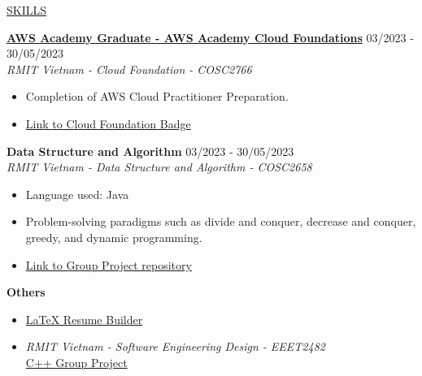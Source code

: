 \documentclass[11pt]{article}
\newcommand{\betteruline}[1]{
    \uline{#1}
}
\newcommand{\sectiontitle}[1]{
    \begingroup
        \titlebold
        \betteruline{\Large\uppercase{#1}  }
        \vspace{1.7mm}
    \endgroup
}
\newcommand{\sectioncontent}[1]{
    \begingroup
        \begin{FlushLeft}
        \vspace{-3mm}
        \sffamily\small#1
        \end{FlushLeft}
    \endgroup
    \vspace{2mm}
}
\newcommand{\project}[2]{
    \begingroup
        \textbf{\small#1}
        \hfill\color{black!70}\small{#2}
    \endgroup
}
\newcommand{\spacevv}{
    \vspace{2mm}
}
\begin{document}
\begin{paracol}{2}
    \sectiontitle{Skills}
    \sectioncontent{
    \vspace{1mm}
        \project{\href{https://www.credly.com/badges/20c053cd-785a-4100-bc79-bd1c902d5c28/public_url}{AWS Academy Graduate - AWS Academy Cloud Foundations}}{03/2023 - 30/05/2023} \\
    \vspace{1mm}
        \textcolor{black!70}{\textit{RMIT Vietnam - Cloud Foundation - COSC2766}}
        \vspace{1mm}
        \begin{itemize}
            \item  Completion of AWS Cloud Practitioner Preparation.
\vspace{1mm} 
            \item \textcolor{blue}{\href{https://www.credly.com/badges/20c053cd-785a-4100-bc79-bd1c902d5c28/public_url}{Link to Cloud Foundation Badge}}
        \end{itemize}
        \spacevv

       \project{Data Structure and Algorithm}{03/2023 - 30/05/2023} \\
    \vspace{1mm}
        \textcolor{black!70}{\textit{RMIT Vietnam - Data Structure and Algorithm - COSC2658}}
        \vspace{1mm}
        \begin{itemize}
        \item Language used: Java
\vspace{1mm} 
\item Problem-solving paradigms such as divide and conquer, decrease and conquer, greedy, and dynamic programming.
\vspace{1mm} 
            \item \textcolor{blue}{\href{https://github.com/miketvo/rmit2023a-cosc2658-group-project}{Link to Group Project repository}}
        \end{itemize}
        \spacevv
       
        \project{Others}{} \\
        \begin{itemize}
        \vspace{1mm}
            \item 
            \textcolor{blue}{\href{https://github.com/LaansDole/my-resume}{LaTeX Resume Builder}}
            \vspace{1mm}
            \item
            \textcolor{black!70}{\textit{RMIT Vietnam - Software Engineering Design - EEET2482}} \\
            \textcolor{blue}{\href{https://github.com/miketvo/rmit2022c-eeet2482-lodging-app}{C++ Group Project}}
        \end{itemize}
        \spacevv
    }


\end{paracol}
\end{document}
